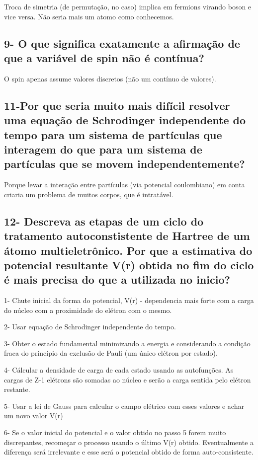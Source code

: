 \documentclass{article}
\begin{document}
Troca de simetria (de permutação, no caso) implica em fermions virando boson e vice versa. Não seria mais um atomo como conhecemos.

\subsection{9- O que significa exatamente a afirmação de que a variável de spin não é contínua?}
O spin apenas assume valores discretos (não um contínuo de valores).

\subsection{11-Por que seria muito mais difícil resolver uma equação de Schrodinger independente do tempo para um sistema de partículas que interagem do que para um sistema de partículas que se movem independentemente?}

Porque levar a interação entre partículas (via potencial coulombiano) em conta criaria um problema de muitos corpos, que é intratável.

\subsection{12- Descreva as etapas de um ciclo do tratamento autoconstistente de Hartree de um átomo multieletrônico. Por que a estimativa do potencial resultante V(r) obtida no fim do ciclo é mais precisa do que a utilizada no inicio?}

1- Chute inicial da forma do potencial, V(r) - dependencia mais forte com a carga do núcleo com a proximidade do elétron com o mesmo.

2- Usar equação de Schrodinger independente do tempo.

3- Obter o estado fundamental minimizando a energia e considerando a condição fraca do princípio da exclusão de Pauli (um único elétron por estado).

4- Cálcular a densidade de carga de cada estado usando as autofunções. As cargas de Z-1 elétrons são somadas ao núcleo e serão a carga sentida pelo elétron restante.

5- Usar a lei de Gauss para calcular o campo elétrico com esses valores e achar um novo valor V(r)

6- Se o valor inicial do potencial e o valor obtido no passo 5 forem muito discrepantes, recomeçar o processo usando o último V(r) obtido. Eventualmente a diferença será irrelevante e esse será o potencial obtido de forma auto-consistente.
\end{document}
